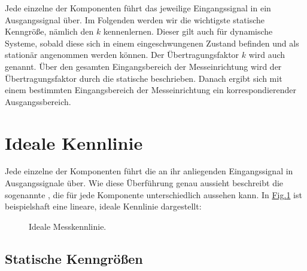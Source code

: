 \documentclass[letterpaper,10pt,english]{jupyterBook}
\let\sphinxpxdimen\pdfpxdimen\else\newdimen\sphinxpxdimen
\begin{document}
\sphinxAtStartPar
Jede einzelne der Komponenten führt das jeweilige Eingangssignal in ein Ausgangssignal über. Im Folgenden werden wir die wichtigste statische Kenngröße, nämlich den  \(k\) kennenlernen. Dieser gilt auch für dynamische Systeme, sobald diese sich in einem eingeschwungenen Zustand befinden und als stationär angenommen werden können.
Der Übertragungsfaktor \(k\) wird auch  genannt.
Über den gesamten Eingangsbereich der Messeinrichtung wird der Übertragungsfaktor durch die statische  beschrieben. Danach ergibt sich mit einem bestimmten Eingangsbereich der Messeinrichtung ein korrespondierender Ausgangssbereich.

\sphinxstepscope


\section{Ideale Kennlinie}
\label{\detokenize{content/2_idealeKennlinie:ideale-kennlinie}}\label{\detokenize{content/2_idealeKennlinie::doc}}
\sphinxAtStartPar


\sphinxAtStartPar
Jede einzelne der Komponenten führt die an ihr anliegenden Eingangssignal in Ausgangssignale über. Wie diese Überführung genau aussieht beschreibt die sogenannte , die für jede Komponente unterschiedlich aussehen kann. In \hyperref[\detokenize{content/2_idealeKennlinie:id1}]{Fig.\@ \ref{\detokenize{content/2_idealeKennlinie:id1}}} ist beispielshaft eine lineare, ideale Kennlinie dargestellt:

\begin{figure}[htbp]
\centering
\capstart

\noindent\sphinxincludegraphics[width=400\sphinxpxdimen]{{ideale_kennlinie}.jpg}
\caption{Ideale Messkennlinie.}\label{\detokenize{content/2_idealeKennlinie:id1}}\end{figure}


\subsection{Statische Kenngrößen}
\label{\detokenize{content/2_idealeKennlinie:statische-kenngroszen}}
\sphinxAtStartPar
\end{document}

